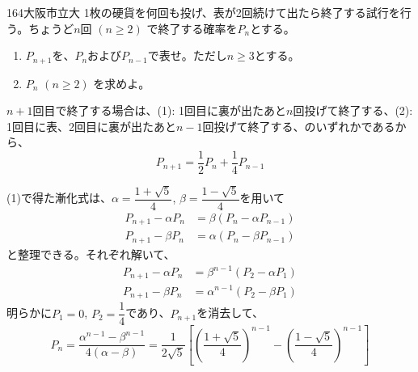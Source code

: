 \begin{thm}{164}{}{大阪市立大}
 1枚の硬貨を何回も投げ、表が2回続けて出たら終了する試行を行う。ちょうど$n$回 $(n\ge 2)$ で終了する確率を$P_n$とする。
 \begin{enumerate}
  \item $P_{n+1}$を、$P_n$および$P_{n-1}$で表せ。ただし$n\ge 3$とする。
  \item $P_n$ $(n\ge 2)$ を求めよ。
 \end{enumerate}
\end{thm}

$n+1$回目で終了する場合は、(1): 1回目に裏が出たあと$n$回投げて終了する、(2): 1回目に表、2回目に裏が出たあと$n-1$回投げて終了する、のいずれかであるから、
\[ P_{n+1}=\frac{1}{2}P_n+\frac{1}{4}P_{n-1} \]

(1)で得た漸化式は、$\alpha=\dfrac{1+\sqrt{5}}{4}$, $\beta=\dfrac{1-\sqrt{5}}{4}$を用いて
\begin{align*}
 P_{n+1}-\alpha P_n&=\beta(P_n-\alpha P_{n-1}) \\
 P_{n+1}-\beta P_n&=\alpha(P_n-\beta P_{n-1}) 
\end{align*}
と整理できる。それぞれ解いて、
\begin{align*}
 P_{n+1}-\alpha P_n&=\beta^{n-1}(P_2-\alpha P_1) \\
 P_{n+1}-\beta P_n&=\alpha^{n-1}(P_2-\beta P_1)
\end{align*}
明らかに$P_1=0$, $P_2=\dfrac{1}{4}$であり、$P_{n+1}$を消去して、
\[ P_n=\frac{\alpha^{n-1}-\beta^{n-1}}{4(\alpha-\beta)}=\frac{1}{2\sqrt{5}}\left[\left(\frac{1+\sqrt{5}}{4}\right)^{n-1}\!\!-\left(\frac{1-\sqrt{5}}{4}\right)^{n-1}\right] \]
